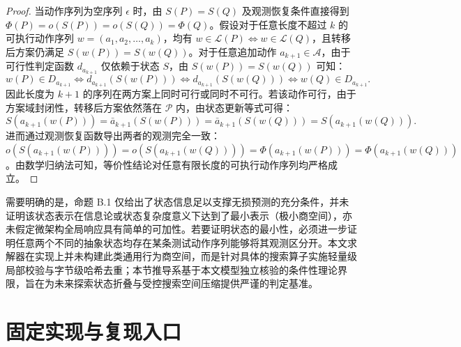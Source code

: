 \documentclass[anonymous,notoc]{gmcm2026}
\begin{document}
\begin{proof} 当动作序列为空序列 \(\epsilon\) 时，由 \(S(P) = S(Q)\) 及观测恢复条件直接得到 \(\Phi(P) = o(S(P)) = o(S(Q)) = \Phi(Q)\)。假设对于任意长度不超过 \(k\) 的可执行动作序列 \(w = (a_1, a_2, \dots, a_k)\)，均有 \(w \in \mathcal{L}(P) \iff w \in \mathcal{L}(Q)\)，且转移后方案仍满足 \(S(w(P)) = S(w(Q))\)。对于任意追加动作 \(a_{k+1} \in \mathcal{A}\)，由于可行性判定函数 \(d_{a_{k+1}}\) 仅依赖于状态 \(S\)，由 \(S(w(P)) = S(w(Q))\) 可知： \begin{equation}
w(P) \in D_{a_{k+1}} \iff d_{a_{k+1}}(S(w(P))) \iff d_{a_{k+1}}(S(w(Q))) \iff w(Q) \in D_{a_{k+1}}.
\end{equation} 因此长度为 \(k+1\) 的序列在两方案上同时可行或同时不可行。若该动作可行，由于方案域封闭性，转移后方案依然落在 \(\mathcal{P}\) 内，由状态更新等式可得： \begin{equation}
S(a_{k+1}(w(P))) = \bar{a}_{k+1}(S(w(P))) = \bar{a}_{k+1}(S(w(Q))) = S(a_{k+1}(w(Q))).
\end{equation} 进而通过观测恢复函数导出两者的观测完全一致：\(o(S(a_{k+1}(w(P)))) = o(S(a_{k+1}(w(Q)))) = \Phi(a_{k+1}(w(P))) = \Phi(a_{k+1}(w(Q)))\)。由数学归纳法可知，等价性结论对任意有限长度的可执行动作序列均严格成立。 \end{proof}

需要明确的是，命题 B.1 仅给出了状态信息足以支撑无损预测的充分条件，并未证明该状态表示在信息论或状态复杂度意义下达到了最小表示（极小商空间），亦未假定微架构全局响应具有简单的可加性。若要证明状态的最小性，必须进一步证明任意两个不同的抽象状态均存在某条测试动作序列能够将其观测区分开。本文求解器在实现上并未构建此类通用行为商空间，而是针对具体的搜索算子实施轻量级局部校验与字节级哈希去重；本节推导系基于本文模型独立核验的条件性理论界限，旨在为未来探索状态折叠与受控搜索空间压缩提供严谨的判定基准。

\section{固定实现与复现入口}
\end{document}

